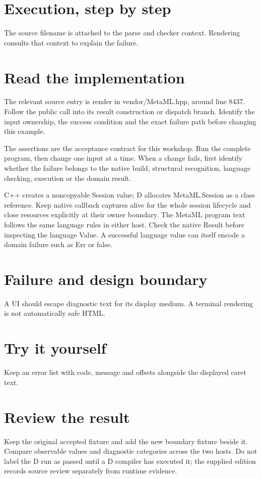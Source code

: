 
\section*{Execution, step by step}
The source filename is attached to the parse and checker context. Rendering consults that context to explain the failure.

\section*{Read the implementation}
The relevant source entry is render in vendor/MetaML.hpp, around line 8437. Follow the public call into its result construction or dispatch branch. Identify the input ownership, the success condition and the exact failure path before changing this example.

The assertions are the acceptance contract for this workshop. Run the complete program, then change one input at a time. When a change fails, first identify whether the failure belongs to the native build, structural recognition, language checking, execution or the domain result.

\clearpage
{}
C++ creates a noncopyable Session value; D allocates MetaML.Session as a class reference. Keep native callback captures alive for the whole session lifecycle and close resources explicitly at their owner boundary. The MetaML program text follows the same language rules in either host. Check the native Result before inspecting the language Value. A successful language value can itself encode a domain failure such as Err or false.


\section*{Failure and design boundary}
A UI should escape diagnostic text for its display medium. A terminal rendering is not automatically safe HTML.

\section*{Try it yourself}
Keep an error list with code, message and offsets alongside the displayed caret text.

\section*{Review the result}
Keep the original accepted fixture and add the new boundary fixture beside it. Compare observable values and diagnostic categories across the two hosts. Do not label the D run as passed until a D compiler has executed it; the supplied edition records source review separately from runtime evidence.

